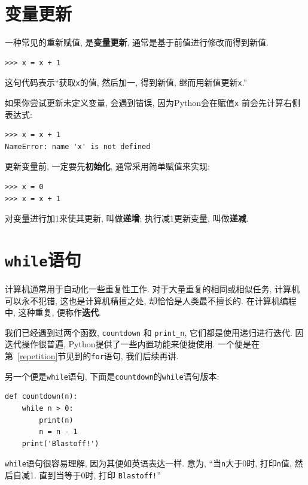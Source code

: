 \documentclass[10pt]{book}
\begin{document}
\section{变量更新}
\label{update}


一种常见的重新赋值, 是{\bf 变量更新},
通常是基于前值进行修改而得到新值. 

\begin{verbatim}
>>> x = x + 1
\end{verbatim}
%
这句代码表示``获取{\tt x}的值, 然后加一, 得到新值, 继而用新值更新{\tt x}.'' 

如果你尝试更新未定义变量, 会遇到错误, 
因为Python会在赋值{\tt x} 前会先计算右侧表达式:

\begin{verbatim}
>>> x = x + 1
NameError: name 'x' is not defined
\end{verbatim}
%
更新变量前, 一定要先{\bf 初始化}, 通常采用简单赋值来实现:

\begin{verbatim}
>>> x = 0
>>> x = x + 1
\end{verbatim}
%
对变量进行加1来使其更新, 叫做{\bf 递增};
执行减1更新变量, 叫做{\bf 递减}. 


\section{{\tt while}语句}
计算机通常用于自动化一些重复性工作. 
对于大量重复的相同或相似任务, 计算机可以永不犯错, 
这也是计算机精擅之处, 却恰恰是人类最不擅长的. 
在计算机编程中, 这种重复, 便称作{\bf 迭代}.

我们已经遇到过两个函数, {\tt countdown} 和
\verb"print_n",  它们都是使用递归进行迭代. 
因迭代操作很普遍, Python提供了一些内置功能来便捷使用. 
一个便是在第~\ref{repetition}节见到的{\tt for}语句, 我们后续再讲. 

另一个便是{\tt while}语句, 下面是{\tt countdown}的{\tt while}语句版本:

\begin{verbatim}
def countdown(n):
    while n > 0:
        print(n)
        n = n - 1
    print('Blastoff!')
\end{verbatim}
%
{\tt while}语句很容易理解, 因为其便如英语表达一样. 
意为, ``当{\tt n}大于0时, 打印{\tt n}值, 然后自减1.
直到当等于0时, 打印 {\tt Blastoff!}''
\end{document}
